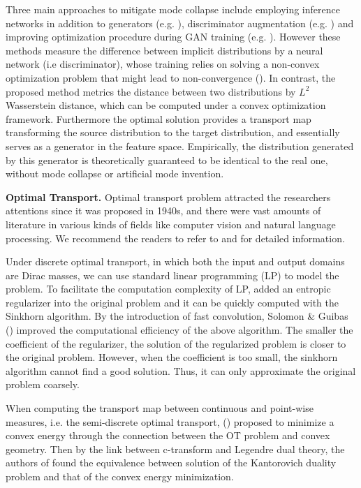 \documentclass{article}
\begin{document}
Three main approaches to mitigate mode collapse include employing inference networks in addition to generators (e.g. \cite{donahue2016adversarial, dumoulin2016adversarially, srivastava2017veegan}), discriminator augmentation (e.g. \cite{che2016mode,salimans2016improved,karras2017progressive,lin2018pacgan}) and improving optimization procedure during GAN training (e.g. \cite{metz2016unrolled}). However these methods measure the difference between implicit distributions by a neural network (i.e discriminator), whose training relies on solving a non-convex optimization problem that might lead to non-convergence (\cite{li2017towards,mescheder2018training}). In contrast, the proposed method metrics the distance between two distributions by $L^2$ Wasserstein distance, which can be computed under a convex optimization framework. Furthermore the optimal solution provides a transport map transforming the source distribution to the target distribution, and essentially serves as a generator in the feature space. Empirically, the distribution generated by this generator is theoretically guaranteed to be identical to the real one, without mode collapse or artificial mode invention. 

\noindent\textbf{Optimal Transport.}
Optimal transport problem attracted the researchers attentions since it was proposed in 1940s, and there were vast amounts of literature in various kinds of fields like computer vision and natural language processing. We recommend the readers to refer to \cite{peyre2018COT} and \cite{solomon2018OTDD} for detailed information.

Under discrete optimal transport, in which both the input and output domains are Dirac masses, we can use standard linear programming (LP) to model the problem. To facilitate the computation complexity of LP,  \cite{cuturi2013sinkhorn} added an entropic regularizer into the original problem and it can be quickly
computed with the Sinkhorn algorithm. By the introduction of fast convolution, Solomon \& Guibas (\cite{Solomoon2015ConvWD}) improved the computational efficiency of the above algorithm. The smaller the coefficient of the regularizer, the solution of the regularized problem is closer to the original problem. However, when the coefficient is too small, the sinkhorn algorithm cannot find a good solution. Thus, it can only approximate the original problem coarsely.

When computing the transport map between continuous and point-wise measures, i.e. the semi-discrete optimal transport, (\cite{gu2013theory}) proposed to minimize a convex energy through the connection between the OT problem and convex geometry. Then by the link between c-transform and Legendre dual theory, the authors of \cite{lei2017geometric} found the equivalence between solution of the Kantorovich duality problem and that of the convex energy minimization.
\end{document}
